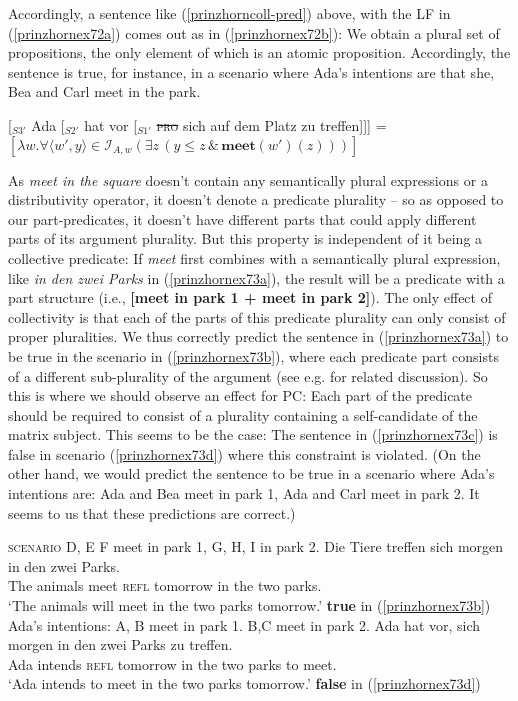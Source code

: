 \documentclass[output=paper]{langscibook}
\begin{document}
Accordingly, a sentence like (\ref{prinzhorncoll-pred}) above, with the LF in (\ref{prinzhornex72a}) comes out as in (\ref{prinzhornex72b}): We obtain a plural set of propositions, the only element of which is an atomic proposition. Accordingly, the sentence is true, for instance, in a scenario where Ada's intentions are that she, Bea and Carl meet in the park.

\ea
\ea   \label{prinzhornex72a} [$_{S3'}$ Ada [$_{S2'}$ hat vor [$_{S1'}$ \sout{\textsc{pro}} sich auf dem Platz zu treffen]]]
\ex {} =  $[\lambda w.  \forall \langle w' ,y \rangle \in \mathcal{I}_{A,w} (\exists z \, (y \le z\, \& \,\textbf{meet}(w')(z)))]$\label{prinzhornex72b}
\z\z

As \textit{meet in the square} doesn't contain any semantically plural expressions or a distributivity operator, it doesn't denote a predicate plurality -- so as opposed to our part-predicates, it doesn't have different parts that could apply different parts of its argument plurality. But this property is independent of it being a collective predicate: If \textit{meet} first combines with a semantically plural expression,  like \textit{in den zwei Parks} in (\ref{prinzhornex73a}), the result will be a predicate with a part structure (i.e., \textbf{[meet in park 1 + meet in park 2]}). The only effect of collectivity is that each of the parts of this predicate plurality can only consist of proper pluralities. We  thus correctly predict the sentence in (\ref{prinzhornex73a}) to be true in the scenario in (\ref{prinzhornex73b}), where each predicate part consists of a different sub-plurality of the argument (see e.g. \citealt{Schwarzschild:1996} for related discussion). So this is where we should observe an effect for PC: Each part of the predicate should be required to consist of a plurality containing a self-candidate of the matrix subject. This  seems to be the case: The sentence in (\ref{prinzhornex73c}) is false in scenario (\ref{prinzhornex73d}) where this constraint is violated. (On the other hand, we would predict the sentence to be true in a scenario where Ada's intentions are: Ada and Bea meet in park 1, Ada and Carl meet in park 2. It seems to us that these predictions are correct.)

\ea 
\ea \textsc{scenario}  D, E F meet in park 1, G, H, I in  park 2.  \label{prinzhornex73b}
\ex \gll Die Tiere treffen sich morgen in den zwei Parks.\\
The animals meet \textsc{refl} tomorrow in the two parks.\\
\glt `The animals will meet in the two parks tomorrow.'  \phantom{.}\hfill \textbf{true} in (\ref{prinzhornex73b})\label{prinzhornex73a}
\ex Ada's intentions: A, B meet in park 1. B,C meet in park 2. \label{prinzhornex73d}
\ex \gll Ada hat vor, sich morgen in den zwei Parks zu treffen.\\
Ada intends {} \textsc{refl} tomorrow in the two parks to meet.\\
\glt `Ada intends to meet in the two parks tomorrow.' \label{prinzhornex73c} \phantom{.}\hfill \textbf{false} in (\ref{prinzhornex73d})
\z\z
\end{document}
